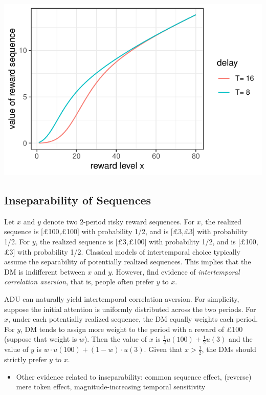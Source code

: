 \documentclass[
  12pt,
]{article}
\providecommand{\tightlist}{%
  \setlength{\itemsep}{0pt}\setlength{\parskip}{0pt}}
\begin{document}
\includegraphics{images/S_shaped_value.pdf}

\hypertarget{inseparability-of-sequences}{%
\subsection{Inseparability of
Sequences}\label{inseparability-of-sequences}}

Let \(x\) and \(y\) denote two 2-period risky reward sequences. For
\(x\), the realized sequence is {[}£100,£100{]} with probability 1/2,
and is {[}£3,£3{]} with probability 1/2. For \(y\), the realized
sequence is {[}£3,£100{]} with probability 1/2, and is {[}£100,£3{]}
with probability 1/2. Classical models of intertemporal choice typically
assume the separability of potentially realized sequences. This implies
that the DM is indifferent between \(x\) and \(y\). However,
\citet{andersen_multiattribute_2018} find evidence of
\emph{intertemporal correlation aversion}, that is, people often prefer
\(y\) to \(x\).

ADU can naturally yield intertemporal correlation aversion. For
simplicity, suppose the initial attention is uniformly distributed
across the two periods. For \(x\), under each potentially realized
sequence, the DM equally weights each period. For \(y\), DM tends to
assign more weight to the period with a reward of £100 (suppose that
weight is \(w\)). Then the value of \(x\) is
\(\frac{1}{2} u(100) + \frac{1}{2} u(3)\) and the value of \(y\) is
\(w\cdot u(100) +(1-w) \cdot u(3)\). Given that \(x>\frac{1}{2}\), the
DMs should strictly prefer \(y\) to \(x\).

\begin{itemize}
\tightlist
\item
  Other evidence related to inseparability: common sequence effect,
  (reverse) mere token effect, magnitude-increasing temporal sensitivity
\end{itemize}
\end{document}
